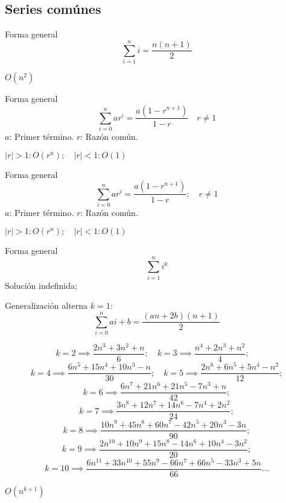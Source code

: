 \documentclass[tikz,11pt,fleqn]{book} %
\begin{document}
\subsection{Series comúnes}

\begin{definition}[Aritmética]
    Forma general
    $$ \sum_{i=1}^ni = \frac{n(n+1)}2 $$
    \begin{fact}[Orden]
        $O(n^2)$
    \end{fact}
\end{definition}

\begin{definition}[Geométrica]
    Forma general
    $$ \sum_{i=0}^nar^i = \frac{a(1-r^{n+1})}{1-r}\quad r\ne1 $$
    $a$: Primer término. $r$: Razón común.
    \begin{fact}[Orden]
        $|r|>1:O(r^n);\quad|r|<1:O(1)$
    \end{fact}
\end{definition}

\begin{definition}[Base 2]
    Forma general
    $$ \sum_{i=0}^nar^i = \frac{a(1-r^{n+1})}{1-r};\quad r\ne1 $$
    $a$: Primer término. $r$: Razón común.
    \begin{fact}[Orden]
        $|r|>1:O(r^n);\quad|r|<1:O(1)$
    \end{fact}
\end{definition}

\begin{definition}[Potencias]
    Forma general
    $$ \sum_{i=1}^ni^k$$
    Solución indefinida;
    \begin{remark}Generalización alterna $k=1$:
        $$\sum_{i=0}^nai+b=\frac{(an+2b)(n+1)}2$$
    \end{remark}
    $$
        k=2\implies\frac{2n^3+3n^2+n}6;\quad
        k=3\implies\frac{n^4+2n^3+n^2}4;\quad
    $$ $$
        k=4\implies\frac{6n^5+15n^4+10n^3-n}{30};\quad
        k=5\implies\frac{2n^6+6n^5+5n^4-n^2}{12};
    $$ $$
        k=6\implies\frac{6n^7+21n^6+21n^5-7n^3+n}{42};
    $$ $$
        k=7\implies\frac{3n^8+12n^7+14n^6-7n^4+2n^2}{24};
    $$ $$
        k=8\implies\frac{10n^9+45n^8+60n^7-42n^5+20n^3-3n}{90};
    $$ $$
        k=9\implies\frac{2n^{10}+10n^9+15n^8-14n^6+10n^4-3n^2}{20};
    $$ $$
        k=10\implies\frac{6n^{11}+33n^{10}+55n^9-66n^7+66n^5-33n^3+5n}{66}\dots
    $$

    \begin{fact}[Orden]
        $O(n^{k+1})$
    \end{fact}
\end{definition}
\end{document}
